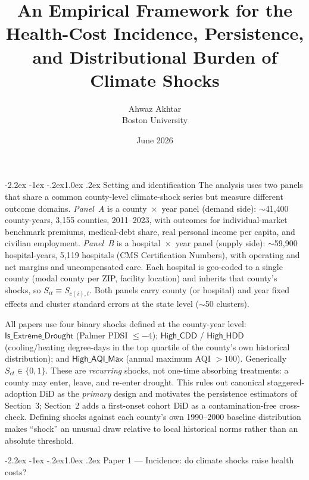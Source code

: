 \documentclass[11pt]{article}
\title{\vspace{-1.2cm}\bfseries An Empirical Framework for the Health-Cost
Incidence, Persistence, and Distributional Burden of Climate Shocks}
\author{Ahwaz Akhtar\\[-2pt]\normalsize Boston University}
\date{\normalsize June 2026}
\makeatletter
\renewcommand\section{\@startsection{section}{1}{\z@}%
  {-2.2ex \@plus -1ex \@minus -.2ex}{1.0ex \@plus .2ex}%
  {\normalfont\large\bfseries}}
\newcommand{\Sct}{S_{ct}}
\makeatother
\begin{document}
\maketitle
\vspace{-0.7cm}

\section{Setting and identification}
The analysis uses two panels that share a common county-level climate-shock
series but measure different outcome domains. \emph{Panel~A} is a
county~$\times$~year panel (demand side): $\sim$41{,}400 county-years, 3{,}155
counties, 2011--2023, with outcomes for individual-market benchmark premiums,
medical-debt share, real personal income per capita, and civilian employment.
\emph{Panel~B} is a hospital~$\times$~year panel (supply side): $\sim$59{,}900
hospital-years, 5{,}119 hospitals (CMS Certification Numbers), with operating and
net margins and uncompensated care. Each hospital is geo-coded to a single county
(modal county per ZIP, facility location) and inherits that county's shocks, so
$S_{it}\equiv S_{c(i),t}$. Both panels carry county (or hospital) and year fixed
effects and cluster standard errors at the state level ($\sim$50 clusters).

All papers use four binary shocks defined at the county-year level:
$\textsf{Is\_Extreme\_Drought}$ (Palmer PDSI $\le-4$);
$\textsf{High\_CDD}$ / $\textsf{High\_HDD}$ (cooling/heating degree-days in the top
quartile of the county's own historical distribution); and
$\textsf{High\_AQI\_Max}$ (annual maximum AQI $>100$). Generically
$\Sct\in\{0,1\}$. These are \emph{recurring} shocks, not one-time absorbing
treatments: a county may enter, leave, and re-enter drought. This rules out
canonical staggered-adoption DiD as the \emph{primary} design and motivates the
persistence estimators of Section~3; Section~2 adds a first-onset cohort DiD as a
contamination-free cross-check. Defining shocks against each county's own
1990--2000 baseline distribution makes ``shock'' an unusual draw relative to local
historical norms rather than an absolute threshold.

\section{Paper 1 --- Incidence: do climate shocks raise health costs?}
\end{document}
